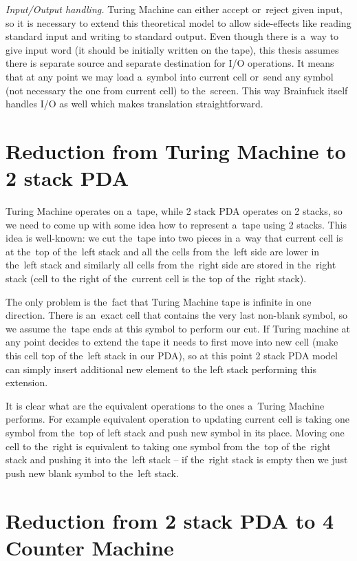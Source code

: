 \documentclass[english,shortabstract,mgr]{iithesis}
\begin{document}
\textit{Input/Output handling.}
Turing Machine can either accept or~reject given input, so it is necessary to
extend this theoretical model to allow side-effects like reading standard
input and writing to standard output. Even though there is a~way to give
input word (it should be initially written on the tape), this thesis assumes
there is separate source and separate destination for I/O operations.
It means that at any point we may load a~symbol into current cell or~send
any symbol (not necessary the one from current cell) to the~screen. This
way Brainfuck itself handles I/O as well which makes translation straightforward.

\section {Reduction from Turing Machine to 2 stack PDA}

Turing Machine operates on a~tape, while 2 stack PDA operates on 2 stacks, so we need
to come up with some idea how to represent a~tape using 2 stacks. This idea is well-known:
we cut the~tape into two pieces in a~way that current cell is at the~top of the~left stack and all
the cells from the~left side are lower in the~left stack and similarly all cells from the~right side
are stored in the~right stack (cell to the right of the~current cell is the top of the~right stack).

The only problem is the~fact that Turing Machine tape is infinite in one direction.
There is an~exact cell that contains the very last non-blank symbol, so we assume the~tape
ends at this symbol to perform our cut. If Turing machine at any point decides to extend
the tape it needs to first move into new cell (make this cell top of the~left stack in our PDA),
so at this point 2 stack PDA model can simply insert additional new element to the left
stack performing this extension.

It is clear what are the equivalent operations to the ones a~Turing Machine performs.
For example equivalent operation to updating current cell is taking one symbol from
the~top of left stack and push new symbol in its place. Moving one cell to the~right
is equivalent to taking one symbol from the~top of the~right stack and pushing it
into the~left stack -- if the~right stack is empty then we just push new blank symbol
to the~left stack.

\section {Reduction from 2 stack PDA to 4 Counter Machine}
\end{document}
